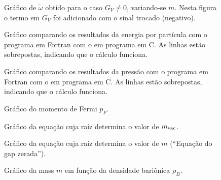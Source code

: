 \begin{figure}
	
	\caption{Gráfico de $\tilde\omega$ obtido para o caso $G_V \neq 0$, variando-se $m$. Nesta figura o termo em $G_V$ foi adicionado com o sinal trocado (negativo). \protect}
	\label{Fig:Fig2.8RBubR_repro_s}
\end{figure}

\begin{figure}
	
	\caption{Gráfico comparando os resultados da energia por partícula com o programa em Fortran com o em programa em C. As linhas estão sobrepostas, indicando que o cálculo funciona. \protect}
	\label{Fig:energy_Comp_C_F}
\end{figure}

\begin{figure}
	
	\caption{Gráfico comparando os resultados da pressão com o programa em Fortran com o em programa em C. As linhas estão sobrepostas, indicando que o cálculo funciona. \protect}
	\label{Fig:pressure_Comp_C_F}
\end{figure}

\FloatBarrier


\begin{figure}
	
	\caption{Gráfico do momento de Fermi $p_F$. \protect}
	\label{Fig:fermi_momentum_NJL-Buballa_Set_1}
\end{figure}

\begin{figure}
	
	\caption{Gráfico da equação cuja raíz determina o valor de $m_{\rm{vac}}$. \protect}
	\label{Fig:vacuum_mass_equation_NJL-Buballa_Set_1}
\end{figure}

\begin{figure}
	
	\caption{Gráfico da equação cuja raíz determina o valor de $m$ (``Equação do gap zerada''). \protect}
	\label{Fig:gap_NJL-Buballa_Set_1}
\end{figure}

\begin{figure}
	
	\caption{Gráfico da mass $m$ em função da densidade bariônica $\rho_B$. \protect}
	\label{Fig:mass_NJL-Buballa_Set_1}
\end{figure}


